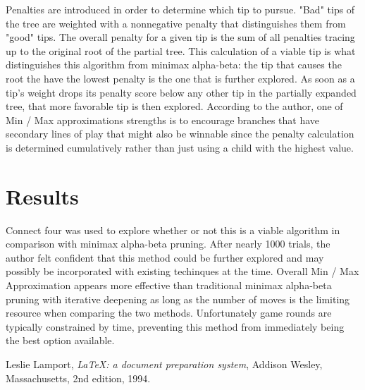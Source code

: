 \documentclass[10pt, a4paper]{article}
\begin{document}
Penalties are introduced in order to determine which tip to pursue.  "Bad" tips of the tree
are weighted with a nonnegative penalty that distinguishes them from "good" tips.
The overall penalty for a given tip is the sum of all penalties tracing up to the original root of the partial tree.
This calculation of a viable tip is what distinguishes this algorithm from minimax alpha-beta: the tip that causes
the root the have the lowest penalty is the one that is further explored. As soon as a tip's
weight drops its penalty score below any other tip in the partially expanded
tree, that more favorable tip is then explored. According to the author, one of Min / Max approximations 
strengths is to encourage branches that have secondary lines of play that might also be
winnable since the penalty calculation is determined cumulatively rather than
just using a child with the highest value.

\section{Results} 

Connect four was used to explore whether or not this is a viable algorithm in comparison
with minimax alpha-beta pruning.  After nearly 1000 trials, the author felt confident
that this method could be further explored and may possibly be incorporated with existing
techinques at the time. Overall Min / Max Approximation appears more effective than traditional 
minimax alpha-beta pruning with iterative deepening as long as the number of moves 
is the limiting resource when comparing the two methods.  Unfortunately game rounds are typically
constrained by time, preventing this method from immediately being the best option available.

\begin{thebibliography}{9}

  Leslie Lamport,
  \emph{\LaTeX: a document preparation system},
  Addison Wesley, Massachusetts,
  2nd edition,
  1994.

\end{thebibliography}
\end{document}
